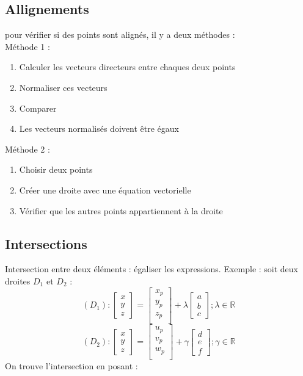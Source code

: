 \documentclass[12pt,a4paper,twoside]{article}
\numberwithin{equation}{subsection}
\begin{document}
\subsection{Allignements}
pour vérifier si des points sont alignés, il y a deux méthodes :\\
Méthode 1 : 
\begin{enumerate}
	\item Calculer les vecteurs directeurs entre chaques deux points
	\item Normaliser ces vecteurs
	\item Comparer
	\item Les vecteurs normalisés doivent être égaux
\end{enumerate}

Méthode 2 : 
\begin{enumerate}
	\item Choisir deux points
	\item Créer une droite avec une équation vectorielle
	\item Vérifier que les autres points appartiennent à la droite
\end{enumerate}

\subsection{Intersections}
Intersection entre deux éléments : égaliser les expressions.
\medbreak
Exemple : soit deux droites $D_1$ et $D_2$ :
\begin{equation}
(D_1):
\begin{bmatrix}
x \\
y\\
z
\end{bmatrix}
=
\begin{bmatrix}
x_p\\
y_p\\
z_p\\
\end{bmatrix}
+
\lambda
\begin{bmatrix}
a\\
b \\
c
\end{bmatrix}
; \lambda \in \mathbb{R}
\end{equation}
\begin{equation}
(D_2):
\begin{bmatrix}
x \\
y\\
z
\end{bmatrix}
=
\begin{bmatrix}
u_p\\
v_p\\
w_p\\
\end{bmatrix}
+
\gamma
\begin{bmatrix}
d\\
e \\
f
\end{bmatrix}
; \gamma \in \mathbb{R}
\end{equation}
On trouve l'intersection en posant :
\end{document}
